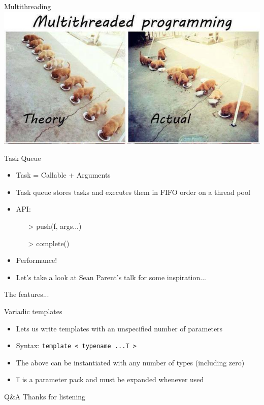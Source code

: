 \documentclass{beamer}
\begin{document}
\begin{frame}{Multithreading}
\includegraphics[width=\linewidth]{concurrency.jpeg}
\end{frame}

\begin{frame}{Task Queue}
\begin{itemize}
\item Task = Callable + Arguments
\item Task queue stores tasks and executes them in FIFO order on a thread pool
\item API:
\begin{itemize}
\item[>] push(f, args...)
\item[>] complete()
\end{itemize}
\item Performance!
\item Let's take a look at Sean Parent's talk for some inspiration...
\end{itemize}
\end{frame}

\begin{frame}[standout]
The features...
\end{frame}

\begin{frame}{Variadic templates}
\begin{itemize}
\item Lets us write templates with an unspecified number of parameters
\item Syntax: \texttt{template < typename ...T >}
\item The above can be instantiated with any number of types (including zero)
\item \texttt{T} is a parameter pack and must be expanded whenever used
\end{itemize}
\end{frame}

\appendix
\begin{frame}{Q\&A}
    \alert{Thanks for listening}
\end{frame}
\end{document}
